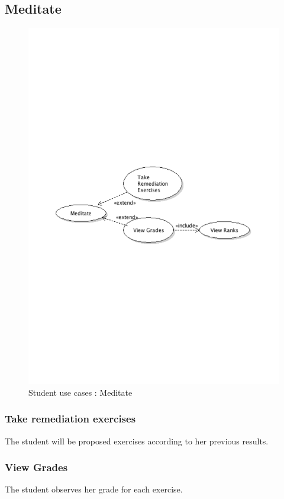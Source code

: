 	\subsection{Meditate}
		\begin{figure}[ht]
			\begin{center}
				\includegraphics[width=\textwidth,  trim=2cm 12cm 2cm 12cm]{UML_figure/use_cases/student/UC_Student_Meditate.pdf}
				\caption{Student use cases : Meditate}
			\end{center}
		\end{figure}
		\subsubsection{Take remediation exercises}
			The student will be proposed exercises according to her previous results.
		\subsubsection{View Grades}
			The student observes her grade for each exercise.
